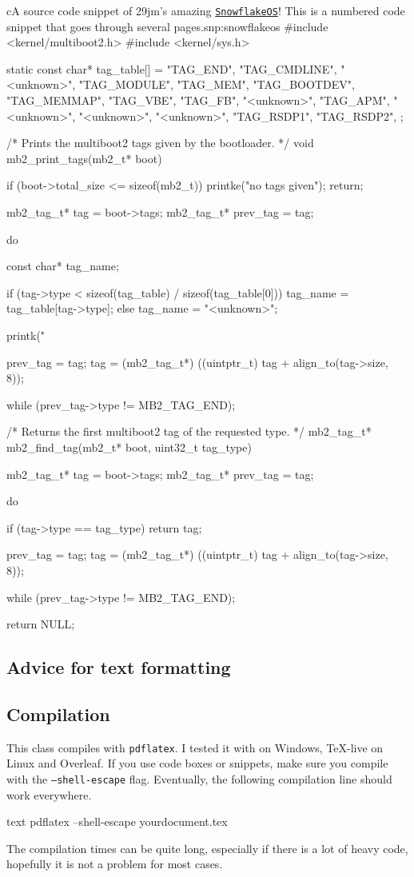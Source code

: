 \documentclass[raggedright, twoside, 11pt, colorful]{tufte-style-article}
\begin{document}
\begin{snippetnum}{c}{A source code snippet of 29jm's amazing \href{https://github.com/29jm/SnowflakeOS}{\texttt{SnowflakeOS}}! This is a numbered code snippet that goes through several pages.}{snp:snowflakeos}
#include <kernel/multiboot2.h>
#include <kernel/sys.h>

static const char* tag_table[] = {
	"TAG_END",
	"TAG_CMDLINE",
	"<unknown>",
	"TAG_MODULE",
	"TAG_MEM",
	"TAG_BOOTDEV",
	"TAG_MEMMAP",
	"TAG_VBE",
	"TAG_FB",
	"<unknown>",
	"TAG_APM",
	"<unknown>",
	"<unknown>",
	"<unknown>",
	"TAG_RSDP1",
	"TAG_RSDP2",
};

/* Prints the multiboot2 tags given by the bootloader.
*/
void mb2_print_tags(mb2_t* boot) {
	if (boot->total_size <= sizeof(mb2_t)) {
		printke("no tags given");
		return;
	}

	mb2_tag_t* tag = boot->tags;
	mb2_tag_t* prev_tag = tag;

	do {
		const char* tag_name;

		if (tag->type < sizeof(tag_table) / sizeof(tag_table[0])) {
			tag_name = tag_table[tag->type];
		} else {
			tag_name = "<unknown>";
		}

		printk("%

		prev_tag = tag;
		tag = (mb2_tag_t*) ((uintptr_t) tag + align_to(tag->size, 8));
	} while (prev_tag->type != MB2_TAG_END);
}

/* Returns the first multiboot2 tag of the requested type.
*/
mb2_tag_t* mb2_find_tag(mb2_t* boot, uint32_t tag_type) {
	mb2_tag_t* tag = boot->tags;
	mb2_tag_t* prev_tag = tag;

	do {
		if (tag->type == tag_type) {
			return tag;
		}

		prev_tag = tag;
		tag = (mb2_tag_t*) ((uintptr_t) tag + align_to(tag->size, 8));
	} while (prev_tag->type != MB2_TAG_END);

	return NULL;
}
\end{snippetnum}


\subsection{Advice for text formatting}


\subsection{Compilation}

This class compiles with \texttt{pdflatex}. I tested it with  on Windows, \TeX-live on Linux and Overleaf. If you use code boxes or snippets, make sure you compile with the \texttt{--shell-escape} flag. Eventually, the following compilation line should work everywhere.
\begin{codebox}{text}
pdflatex --shell-escape yourdocument.tex
\end{codebox}
The compilation times can be quite long, especially if there is a lot of heavy code, hopefully it is not a problem for most cases.
\end{document}
